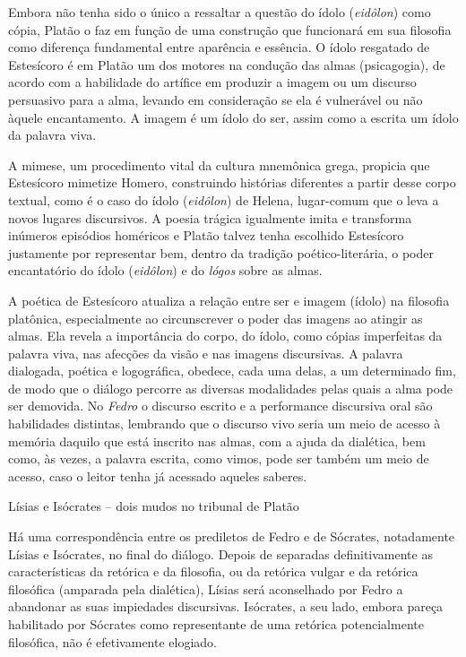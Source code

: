 Embora não tenha sido o único a ressaltar a questão do ídolo
(\emph{eidôlon}) como cópia, Platão o faz em função de uma construção
que funcionará em sua filosofia como diferença fundamental entre
aparência e essência. O ídolo resgatado de Estesícoro é em Platão um dos
motores na condução das almas (psicagogia), de acordo com a habilidade
do artífice em produzir a imagem ou um discurso persuasivo para a alma,
levando em consideração se ela é vulnerável ou não àquele encantamento.
A imagem é um ídolo do ser, assim como a escrita um ídolo da palavra
viva.

A mimese, um procedimento vital da cultura mnemônica grega, propicia que
Estesícoro mimetize Homero, construindo histórias diferentes a partir
desse corpo textual, como é o caso do ídolo (\emph{eidôlon}) de Helena,
lugar-comum que o leva a novos lugares discursivos. A poesia trágica
igualmente imita e transforma inúmeros episódios homéricos e Platão
talvez tenha escolhido Estesícoro justamente por representar bem, dentro
da tradição poético-literária, o poder encantatório do ídolo
(\emph{eidôlon}) e do \emph{lógos} sobre as almas.

A poética de Estesícoro atualiza a relação entre ser e imagem (ídolo) na
filosofia platônica, especialmente ao circunscrever o poder das imagens
ao atingir as almas. Ela revela a importância do corpo, do ídolo, como
cópias imperfeitas da palavra viva, nas afecções da visão e nas imagens
discursivas. A palavra dialogada, poética e logográfica, obedece, cada
uma delas, a um determinado fim, de modo que o diálogo percorre as
diversas modalidades pelas quais a alma pode ser demovida. No
\emph{Fedro} o discurso escrito e a performance discursiva oral são
habilidades distintas, lembrando que o discurso vivo seria um meio de
acesso à memória daquilo que está inscrito nas almas, com a ajuda da
dialética, bem como, às vezes, a palavra escrita, como vimos, pode ser
também um meio de acesso, caso o leitor tenha já acessado aqueles
saberes.

Lísias e Isócrates -- dois mudos no tribunal de Platão

Há uma correspondência entre os prediletos de Fedro e de Sócrates,
notadamente Lísias e Isócrates, no final do diálogo. Depois de separadas
definitivamente as características da retórica e da filosofia, ou da
retórica vulgar e da retórica filosófica (amparada pela dialética),
Lísias será aconselhado por Fedro a abandonar as suas impiedades
discursivas. Isócrates, a seu lado, embora pareça habilitado por
Sócrates como representante de uma retórica potencialmente filosófica,
não é efetivamente elogiado.

